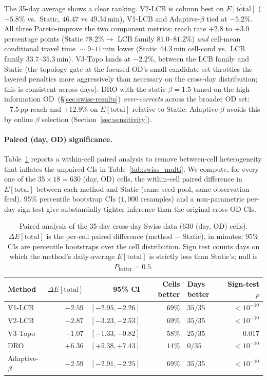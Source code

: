 \documentclass[11pt]{article}
\theoremstyle{definition}
\theoremstyle{remark}
\begin{document}
The 35-day average shows a clear ranking. V2-LCB is column best on
$\overline{E[\mathrm{total}]}$ ($-5.8\%$ vs.\ Static, $46.47$ vs
$49.34$\,min), V1-LCB and Adaptive-$\beta$ tied at $-5.2\%$.
All three Pareto-improve the two component metrics: reach rate
$+2.8$ to $+3.0$ percentage points (Static $78.2\%\!\to\!$ LCB family
$81.0$--$81.2\%$) \emph{and} cell-mean conditional travel time
$\!\sim\!9$--$11$\,min lower (Static $44.3$\,min cell-cond vs.\ LCB family
$33.7$--$35.3$\,min). V3-Topo lands at $-2.2\%$, between the LCB
family and Static (the topology gate at the focused-OD's small
candidate set throttles the layered penalties more aggressively
than necessary on the cross-day distribution; this is consistent
across days). DRO with the static $\beta=1.5$ tuned on the
high-information OD~(\S\ref{sec:swiss-results}) \emph{over-corrects}
across the broader OD set: $-7.5$\,pp reach and $+12.9\%$ on
$\overline{E[\mathrm{total}]}$ relative to Static; Adaptive-$\beta$
avoids this by online $\beta$ selection
(Section~\ref{sec:sensitivity}).

\paragraph{Paired (day, OD) significance.} Table~\ref{tab:swiss_paired}
reports a within-cell paired analysis to remove
between-cell heterogeneity that inflates the unpaired CIs in
Table~\ref{tab:swiss_multi}. We compute, for every one
of the $35\times 18 = 630$ (day, OD) cells, the within-cell paired
difference in $E[\mathrm{total}]$ between each method and Static (same
seed pool, same observation feed). $95\%$ percentile bootstrap CIs
($1{,}000$ resamples) and a non-parametric per-day sign test give
substantially tighter inference than the original cross-OD CIs.

\begin{table}[t]
\centering
\caption{Paired analysis of the 35-day cross-day Swiss data
(630 (day, OD) cells). $\Delta E[\mathrm{total}]$ is the per-cell paired
difference (method $-$ Static), in minutes; $95\%$ CIs are
percentile bootstraps over the cell distribution. Sign test counts
days on which the method's daily-average $E[\mathrm{total}]$ is
strictly less than Static's; null is $P_{\mathrm{better}}=0.5$.}
\label{tab:swiss_paired}
\begin{tabular}{l rrrl r}
\toprule
Method & $\Delta E[\mathrm{total}]$ & 95\% CI & Cells better & Days better & Sign-test $p$ \\
\midrule
V1-LCB           & $-2.59$ & $[-2.95,-2.26]$ & $69\%$ & $35/35$ & $<10^{-10}$ \\
V2-LCB           & $-2.87$ & $[-3.23,-2.53]$ & $69\%$ & $35/35$ & $<10^{-10}$ \\
V3-Topo          & $-1.07$ & $[-1.33,-0.82]$ & $58\%$ & $25/35$ & $0.017$ \\
DRO              & $+6.36$ & $[+5.38,+7.43]$ & $14\%$ & $0/35$  & $<10^{-10}$ \\
Adaptive-$\beta$ & $-2.59$ & $[-2.91,-2.25]$ & $69\%$ & $35/35$ & $<10^{-10}$ \\
\bottomrule
\end{tabular}
\end{table}
\end{document}
